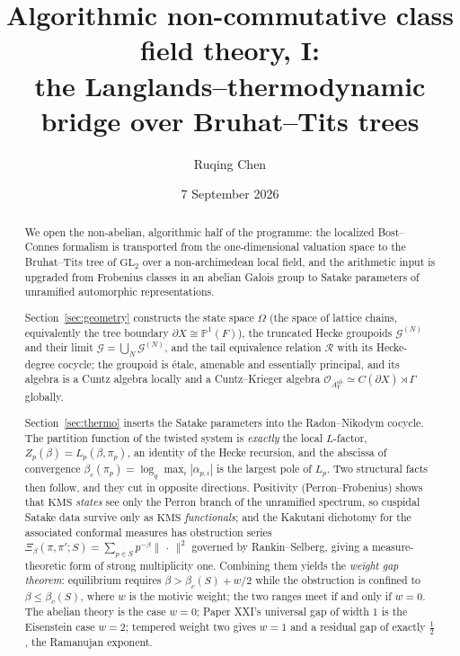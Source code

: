 \documentclass[11pt]{amsart}
\title[Algorithmic non-commutative class field theory, I]
{Algorithmic non-commutative class field theory, I:\\
the Langlands--thermodynamic bridge over Bruhat--Tits trees}
\author{Ruqing Chen}
\date{7 September 2026}
\numberwithin{equation}{section}
\theoremstyle{definition}
\theoremstyle{remark}
\newcommand{\PPone}{\mathbb{P}^1}
\newcommand{\cG}{\mathcal{G}}
\newcommand{\cO}{\mathcal{O}}
\newcommand{\cR}{\mathcal{R}}
\newcommand{\KMS}{\mathrm{KMS}}
\newcommand{\GL}{\mathrm{GL}}
\begin{document}
\begin{abstract}
We open the non-abelian, algorithmic half of the programme: the localized Bost--Connes
formalism is transported from the one-dimensional valuation space to the Bruhat--Tits
tree of $\GL_2$ over a non-archimedean local field, and the arithmetic input is upgraded
from Frobenius classes in an abelian Galois group to Satake parameters of unramified
automorphic representations.

Section~\ref{sec:geometry} constructs the state space $\Omega$ (the space of lattice
chains, equivalently the tree boundary $\partial X\cong\PPone(F)$), the truncated Hecke
groupoids $\cG^{(N)}$ and their limit $\cG=\bigcup_N\cG^{(N)}$, and the tail equivalence
relation $\cR$ with its Hecke-degree cocycle; the groupoid is \'etale, amenable and
essentially principal, and its algebra is a Cuntz algebra locally and a Cuntz--Krieger
algebra $\cO_{A^{\mathrm{nb}}_Y}\simeq C(\partial X)\rtimes\Gamma$ globally.

Section~\ref{sec:thermo} inserts the Satake parameters into the Radon--Nikodym cocycle.
The partition function of the twisted system is \emph{exactly} the local $L$-factor,
$Z_p(\beta)=L_p(\beta,\pi_p)$, an identity of the Hecke recursion, and the abscissa of
convergence $\beta_c(\pi_p)=\log_q\max_i|\alpha_{p,i}|$ is the largest pole of $L_p$. Two
structural facts then follow, and they cut in opposite directions. Positivity
(Perron--Frobenius) shows that $\KMS$ \emph{states} see only the Perron branch of the
unramified spectrum, so cuspidal Satake data survive only as $\KMS$ \emph{functionals};
and the Kakutani dichotomy for the associated conformal measures has obstruction series
$\Xi_\beta(\pi,\pi';S)=\sum_{p\in S}p^{-\beta}\|\,\cdot\,\|^2$ governed by
Rankin--Selberg, giving a measure-theoretic form of strong multiplicity one. Combining
them yields the \emph{weight gap theorem}: equilibrium requires
$\beta>\beta_c(S)+w/2$ while the obstruction is confined to $\beta\le\beta_c(S)$, where
$w$ is the motivic weight; the two ranges meet if and only if $w=0$. The abelian theory
is the case $w=0$; Paper XXI's universal gap of width $1$ is the Eisenstein case $w=2$;
tempered weight two gives $w=1$ and a residual gap of exactly $\tfrac12$, the Ramanujan
exponent.


\end{abstract}
\end{document}
